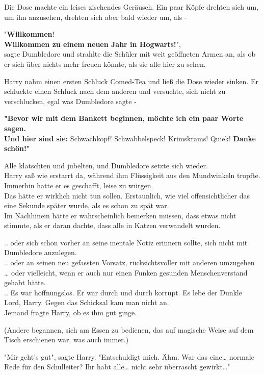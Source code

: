 {Die Dose machte ein leises zischendes Geräusch. Ein paar Köpfe drehten sich um, um ihn anzusehen, drehten sich aber bald wieder um, als -

"\textbf{Willkommen}!\\ \textbf{Willkommen zu einem neuen Jahr in Hogwarts!}",\\ sagte Dumbledore und strahlte die Schüler mit weit geöffneten Armen an, als ob er sich über nichts mehr freuen könnte, als sie alle hier zu sehen.

Harry nahm einen ersten Schluck Comed-Tea und ließ die Dose wieder sinken. Er schluckte einen Schluck nach dem anderen und versuchte, sich nicht zu verschlucken, egal was Dumbledore sagte -

\textbf{"Bevor wir mit dem Bankett beginnen, möchte ich ein paar Worte sagen.\\ Und hier sind sie:} Schwachkopf! Schwabbelspeck! Krimskrams! Quiek! \textbf{Danke schön!"}

Alle klatschten und jubelten, und Dumbledore setzte sich wieder.\\ Harry saß wie erstarrt da, während ihm Flüssigkeit aus den Mundwinkeln tropfte. Immerhin hatte er es geschafft, leise zu würgen.\\ Das hätte er wirklich nicht tun sollen. Erstaunlich, wie viel offensichtlicher das eine Sekunde später wurde, als es schon zu spät war.\\ Im Nachhinein hätte er wahrscheinlich bemerken müssen, dass etwas nicht stimmte, als er daran dachte, dass alle in Katzen verwandelt wurden.

.. oder sich schon vorher an seine mentale Notiz erinnern sollte, sich nicht mit Dumbledore anzulegen.\\ .. oder an seinen neu gefassten Vorsatz, rücksichtsvoller mit anderen umzugehen\\ … oder vielleicht, wenn er auch nur einen Funken gesunden Menschenverstand gehabt hätte.\\ .. Es war hoffnungslos. Er war durch und durch korrupt. Es lebe der Dunkle Lord, Harry. Gegen das Schicksal kam man nicht an.\\ Jemand fragte Harry, ob es ihm gut ginge.

(Andere begannen, sich am Essen zu bedienen, das auf magische Weise auf dem Tisch erschienen war, was auch immer.)

"Mir geht's gut", sagte Harry. "Entschuldigt mich. Ähm. War das eine… normale Rede für den Schulleiter? Ihr habt alle… nicht sehr überrascht gewirkt…"

}
